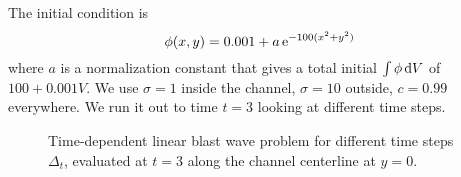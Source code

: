 The initial condition is
\begin{equation*}
  \phi(x,y) = 0.001 + a \mathop{}\!\mathrm{e}^{-100 (x^2 + y^2) }
\end{equation*}
where $a$ is a normalization constant that gives a total initial $\int \phi
\mathop{}\!\mathrm{d} V$ of $100 + 0.001 V$. We use $\sigma=1$ inside the channel, $\sigma=10$
outside, $c=0.99$ everywhere. We run it out to time $t=3$ looking at different
time steps.
\begin{figure}[htb]
  \centering\small
  \subfigure[$\Delta_t=0.02$]{\hspace{-.1in}\hspace{-.1in}}%
  \subfigure[$\Delta_t=0.05$]{\hspace{-.1in}\hspace{-.1in}}
  \subfigure[$\Delta_t=0.10$]{\hspace{-.1in}\hspace{-.1in}}%
  \subfigure[$\Delta_t=0.20$]{\hspace{-.1in}\hspace{-.1in}}
  \subfigure[$\Delta_t=0.50$]{\hspace{-.1in}\hspace{-.1in}}%
  \subfigure[$\Delta_t=1.00$]{\hspace{-.1in}\hspace{-.1in}}
  \caption{Time-dependent linear blast wave problem for different time steps
  $\Delta_t$, evaluated at $t=3$ along the channel centerline at $y=0$.}
  \label{fig:blastAp1Results}
\end{figure}

